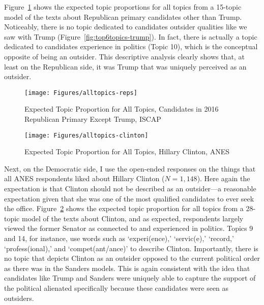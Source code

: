 \documentclass[12pt]{article}
\begin{document}
\begin{appendices}
\begin{refsection}
Figure~\ref{fig:alltopics-reps} shows the expected topic proportions for all topics from a 15-topic model of the texts about Republican primary candidates other than Trump. Noticeably, there is no topic dedicated to candidates outsider qualities like we saw with Trump (Figure~\ref{fig:top6topics-trump}). In fact, there is actually a topic dedicated to candidates experience in politics (Topic 10), which is the conceptual opposite of being an outsider. This descriptive analysis clearly shows that, at least on the Republican side, it was Trump that was uniquely perceived as an outsider. 

\begin{figure}[h!]
	\centering
	\texttt{[image: Figures/alltopics-reps]}
	\caption{Expected Topic Proportion for All Topics, Candidates in 2016 Republican Primary Except Trump, ISCAP}\label{fig:alltopics-reps}
\end{figure}

\begin{figure}[h!]
	\centering
	\texttt{[image: Figures/alltopics-clinton]}
	\caption{Expected Topic Proportion for All Topics, Hillary Clinton, ANES}
		\label{fig:alltopics-clinton}
\end{figure}

Next, on the Democratic side, I use the open-ended responses on the things that all ANES respondents liked about Hillary Clinton ($N = 1,148$). Here again the expectation is that Clinton should not be described as an outsider---a reasonable expectation given that she was one of the most qualified candidates to ever seek the office. Figure~\ref{fig:alltopics-clinton} shows the expected topic proportion for all topics from a 28-topic model of the texts about Clinton, and as expected, respondents largely viewed the former Senator as connected to and experienced in politics. Topics 9 and 14, for instance, use words such as `experi(ence),' `servic(e),' `record,' `profess(ional),' and `compet(ant/ance)' to describe Clinton. Importantly, there is no topic that depicts Clinton as an outsider opposed to the current political order as there was in the Sanders models. This is again consistent with the idea that candidates like Trump and Sanders were uniquely able to capture the support of the political alienated specifically because these candidates were seen as outsiders. 













\end{refsection}
\end{appendices}
\end{document}
